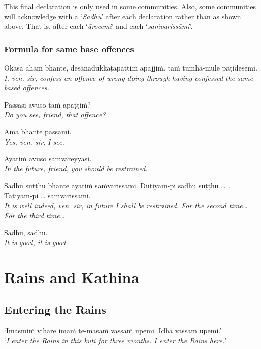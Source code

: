 This final declaration is only used in some communities. Also, some communities
will acknowledge with a ‘\emph{Sādhu}’ after each declaration rather than as
shown above. That is, after each ‘\emph{ārocemi}’ and each
‘\emph{saṁvarissāmi}’.

\subsubsection{Formula for same base offences}

\hangindent=25pt%
\parbox{22pt}{} Okāsa ahaṁ bhante, desanādukkaṭāpattiṁ āpajjiṁ, taṁ tumha-mūle paṭidesemi.\\ \emph{I, ven. sir, confess an offence of wrong-doing through having confessed the same-based offences.}

\hangindent=25pt%
\parbox{22pt}{} Passasi āvuso taṁ āpaṭṭiṁ?\\ \emph{Do you see, friend, that offence?}

\hangindent=25pt%
\parbox{22pt}{} Āma bhante passāmi.\\ \emph{Yes, ven. sir, I see.}

\hangindent=25pt%
\parbox{22pt}{} Āyatiṁ āvuso saṁvareyyāsi.\\ \emph{In the future, friend, you should be restrained.}

\hangindent=25pt%
\parbox{22pt}{} Sādhu suṭṭhu bhante āyatiṁ saṁvarissāmi. Dutiyam-pi sādhu suṭṭhu … . Tatiyam-pi … saṁvarissāmi.\\ \emph{It is well indeed, ven. sir, in future I shall be restrained. For the second time… For the third time…}

\hangindent=25pt%
\parbox{22pt}{} Sādhu, sādhu.\\ \emph{It is good, it is good.} 

\section{Rains and Kathina}

\subsection{Entering the Rains}

‘Imasmiṁ vihāre imaṁ te-māsaṁ vassaṁ upemi. Idha vassaṁ upemi.’\\
‘\emph{I enter the Rains in this kuṭi for three months. I enter the Rains
  here.}’

